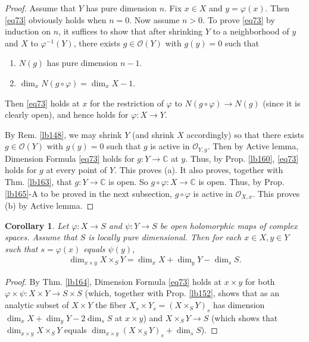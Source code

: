 \documentclass[12pt,b5paper,notitlepage]{report}
\theoremstyle{definition}
\theoremstyle{plain}
\newtheorem{co}[df]{Corollary}
\newcommand{\scr}{\mathscr}
\newcommand{\Cbb}{\mathbb C}
\numberwithin{equation}{section}
\begin{document}
\begin{proof}
Assume that $Y$ has pure dimension $n$. Fix $x\in X$ and $y=\varphi(x)$. Then \eqref{eq73} obviously holds when $n=0$. Now assume $n>0$. To prove \eqref{eq73} by induction on $n$, it suffices to show that after shrinking $Y$ to a neighborhood of $y$ and $X$ to $\varphi^{-1}(Y)$, there exists $g\in\scr O(Y)$ with $g(y)=0$ such that
\begin{enumerate}[label=(\alph*)]
\item $N(g)$ has pure dimension $n-1$.
\item $\dim_x N(g\circ\varphi)=\dim_xX-1$.
\end{enumerate}
Then \eqref{eq73} holds at $x$ for the restriction of $\varphi$ to $N(g\circ\varphi)\rightarrow N(g)$ (since it is clearly open), and hence holds for $\varphi:X\rightarrow Y$.

By Rem. \ref{lb148}, we may shrink $Y$ (and shrink $X$ accordingly) so that there exists $g\in\scr O(Y)$ with $g(y)=0$ such that $g$ is active in $\scr O_{Y,y}$. Then by Active lemma, Dimension Formula \eqref{eq73} holds for $g:Y\rightarrow\Cbb$ at $y$. Thus, by Prop. \ref{lb160}, \eqref{eq73} holds for $g$ at every point of $Y$. This proves (a). It also proves, together with Thm. \ref{lb163}, that $g:Y\rightarrow\Cbb$ is open. So $g\circ\varphi:X\rightarrow\Cbb$ is open. Thus, by Prop. \ref{lb165}-A to be proved in the next subsection, $g\circ\varphi$ is active in $\scr O_{X,x}$. This proves (b) by Active lemma.
\end{proof}



\begin{co}
Let $\varphi:X\rightarrow S$ and $\psi:Y\rightarrow S$ be open holomorphic maps of complex spaces. Assume that $S$ is locally pure dimensional. Then for each $x\in X,y\in Y$ such that $s=\varphi(x)$ equals $\psi(y)$,
\begin{align}
\dim_{x\times y}X\times_SY=\dim_x X+\dim_y Y-\dim_sS.
\end{align}
\end{co}

\begin{proof}
By Thm. \ref{lb164}, Dimension Formula \eqref{eq73} holds at $x\times y$ for both $\varphi\times\psi:X\times Y\rightarrow S\times S$ (which, together with Prop. \ref{lb152}, shows that as an analytic subset of $X\times Y$ the fiber $X_s\times Y_s=(X\times_SY)_s$ has dimension $\dim_x X+\dim_yY-2\dim_sS$ at $x\times y$) and $X\times_SY\rightarrow S$ (which shows that $\dim_{x\times y}X\times_SY$ equals $\dim_{x\times y}(X\times_SY)_s+\dim_sS$).
\end{proof}
\end{document}
